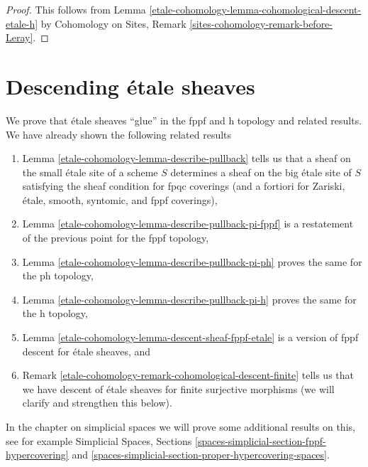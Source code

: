 \begin{proof}
This follows from Lemma \ref{etale-cohomology-lemma-cohomological-descent-etale-h}
by Cohomology on Sites, Remark \ref{sites-cohomology-remark-before-Leray}.
\end{proof}

\section{Descending \'etale sheaves}
\label{etale-cohomology-section-glueing-etale}
We prove that \'etale sheaves ``glue'' in the fppf and h topology
and related results. We have already shown the following related
results
\begin{enumerate}
\item Lemma \ref{etale-cohomology-lemma-describe-pullback} tells us that a sheaf
on the small \'etale site of a scheme $S$ determines a sheaf on the
big \'etale site of $S$ satisfying the sheaf condition for
fpqc coverings (and a fortiori for Zariski, \'etale, smooth, syntomic,
and fppf coverings),
\item Lemma \ref{etale-cohomology-lemma-describe-pullback-pi-fppf} is a restatement of
the previous point for the fppf topology,
\item Lemma \ref{etale-cohomology-lemma-describe-pullback-pi-ph} proves the same for the
ph topology,
\item Lemma \ref{etale-cohomology-lemma-describe-pullback-pi-h} proves the same for the
h topology,
\item Lemma \ref{etale-cohomology-lemma-descent-sheaf-fppf-etale} is a version of
fppf descent for \'etale sheaves, and
\item Remark \ref{etale-cohomology-remark-cohomological-descent-finite} tells us that
we have descent of \'etale sheaves for finite surjective morphisms
(we will clarify and strengthen this below).
\end{enumerate}
In the chapter on simplicial spaces we will prove some additional
results on this, see for example
Simplicial Spaces, Sections \ref{spaces-simplicial-section-fppf-hypercovering}
and \ref{spaces-simplicial-section-proper-hypercovering-spaces}.

